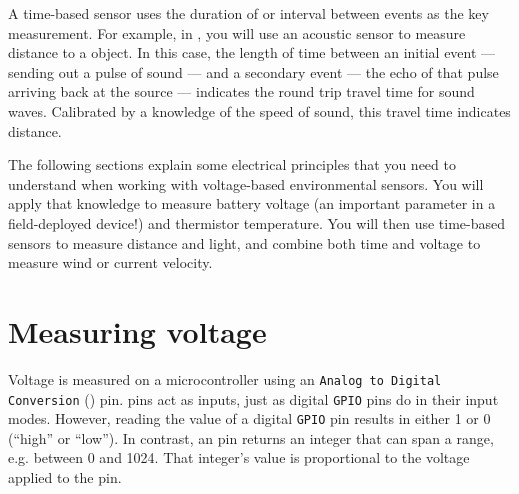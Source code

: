 A time-based sensor uses the duration of or interval between events as the key measurement.
For example, in , you will use an acoustic sensor to measure distance to a object.
In this case, the length of time between an initial event --- sending out a pulse of sound --- and a secondary event --- the echo of that pulse arriving back at the source --- indicates the round trip travel time for sound waves.
Calibrated by a knowledge of the speed of sound, this travel time indicates distance.

The following sections explain some electrical principles that you need to understand when working with voltage-based environmental sensors. You will apply that knowledge to measure battery voltage (an important parameter in a field-deployed device!) and thermistor temperature. You will then use time-based sensors to measure distance and light, and combine both time and voltage to measure wind or current velocity.

%
%
%

\section{Measuring voltage}
Voltage is measured on a microcontroller using an \texttt{Analog to Digital Conversion} (\adc) pin.
\adc pins act as inputs, just as digital \texttt{GPIO} pins do in their input modes.
However, reading the value of a digital \texttt{GPIO} pin results in either 1 or 0 (``high'' or ``low''). In contrast, an \adc pin returns an integer that can span a range, e.g. between 0 and 1024.
That integer's value is proportional to the voltage applied to the \adc pin.

